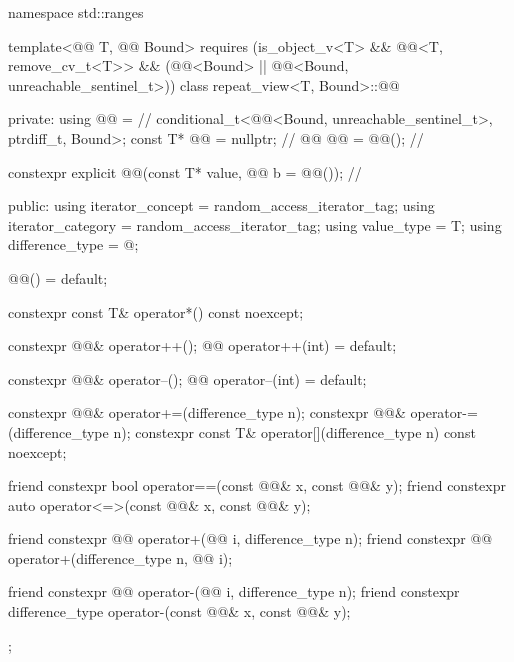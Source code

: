 %
\begin{codeblock}
namespace std::ranges {
  template<@@ T, @@ Bound>
    requires (is_object_v<T> && @@<T, remove_cv_t<T>> &&
              (@@<Bound> ||
               @@<Bound, unreachable_sentinel_t>))
  class repeat_view<T, Bound>::@@ {
  private:
    using @@ =                          // \expos
      conditional_t<@@<Bound, unreachable_sentinel_t>, ptrdiff_t, Bound>;
    const T* @@ = nullptr;                  // \expos
    @@ @@ = @@();         // \expos

    constexpr explicit @@(const T* value, @@ b = @@());   // \expos

  public:
    using iterator_concept = random_access_iterator_tag;
    using iterator_category = random_access_iterator_tag;
    using value_type = T;
    using difference_type = @\seebelow@;

    @@() = default;

    constexpr const T& operator*() const noexcept;

    constexpr @@& operator++();
    @@ operator++(int) = default;

    constexpr @@& operator--();
    @@ operator--(int) = default;

    constexpr @@& operator+=(difference_type n);
    constexpr @@& operator-=(difference_type n);
    constexpr const T& operator[](difference_type n) const noexcept;

    friend constexpr bool operator==(const @@& x, const @@& y);
    friend constexpr auto operator<=>(const @@& x, const @@& y);

    friend constexpr @@ operator+(@@ i, difference_type n);
    friend constexpr @@ operator+(difference_type n, @@ i);

    friend constexpr @@ operator-(@@ i, difference_type n);
    friend constexpr difference_type operator-(const @@& x, const @@& y);
  };
}
\end{codeblock}

